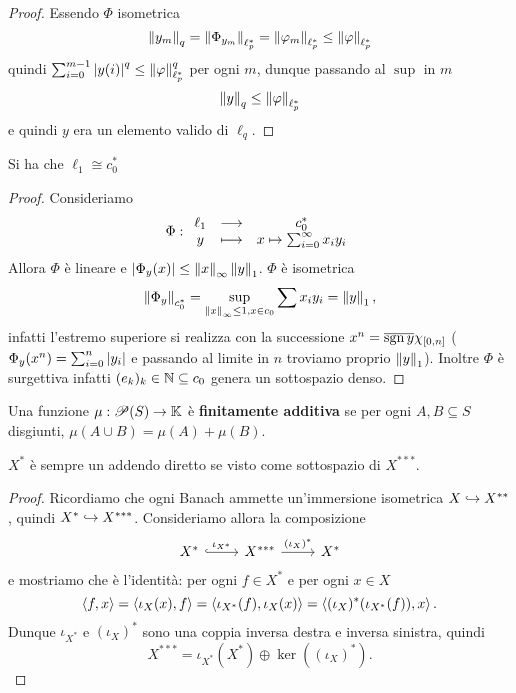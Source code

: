 \begin{proof}
Essendo $\Phi$ isometrica
\[\left\Vert{y_m}\right\Vert_q=\left\Vert{\Phi_{y_m}}\right\Vert_{\ell_p^\ast}=\left\Vert{\varphi_m}\right\Vert_{\ell_p^\ast}\leq \left\Vert{\varphi}\right\Vert_{\ell_p^\ast}\]
quindi $\sum_{i=0}^{m-1}\left|{y(i)}\right|^q\leq \left\Vert{\varphi}\right\Vert_{\ell_p^\ast}^q$ per ogni $m$, dunque passando al $\sup$ in $m$ 
\[\left\Vert{y}\right\Vert_q\leq \left\Vert{\varphi}\right\Vert_{\ell_p^\ast}\]
e quindi $y$ era un elemento valido di $\ell_q$.
\setlength{\leftmargini}{0.5cm}
\end{proof}


\begin{proposition}\label{PrDualec0El1}
Si ha che $\ell_1\cong c_0^\ast$
\end{proposition}
\begin{proof}
Consideriamo
\[\Phi:\begin{array}{ccc} {\ell_1} & \longrightarrow & {c_0^\ast}\\ {y} & \longmapsto & {x\mapsto \sum_{i=0}^\infty x_i y_i} \end{array}\]
Allora $\Phi$ \`e lineare e $\left|{\Phi_y(x)}\right|\leq \left\Vert{x}\right\Vert_\infty\left\Vert{y}\right\Vert_1$. $\Phi$ \`e isometrica
\[\left\Vert{\Phi_y}\right\Vert_{c_0^\ast}=\sup_{\left\Vert{x}\right\Vert_\infty\leq 1, x\in c_0}\sum x_i y_i=\left\Vert{y}\right\Vert_1,\]
infatti l'estremo superiore si realizza con la successione $x^n=\overline{\operatorname{sgn} y}\chi_{[0,n]}$ ($\Phi_y(x^n)=\sum_{i=0}^n\left|{y_i}\right|$ e passando al limite in $n$ troviamo proprio $\left\Vert{y}\right\Vert_1$). Inoltre $\Phi$ \`e surgettiva infatti $(e_k)_k\in\mathbb{N}\subseteq c_0$ genera un sottospazio denso.
\end{proof}


\begin{definition}
Una funzione $\mu:\mathscr{P}(S)\to\mathbb{K}$ \`e \textbf{finitamente additiva} se per ogni $A,B\subseteq S$ disgiunti, $\mu(A\cup B)=\mu(A)+\mu(B)$.
\end{definition}

\begin{lemma}\label{LmDualeComplementatoNelTriduale}
$X^\ast$ \`e sempre un addendo diretto se visto come sottospazio di $X^{\ast\ast\ast}$.
\end{lemma}
\begin{proof}
Ricordiamo che ogni Banach ammette un'immersione isometrica $X\hookrightarrow X^{\ast\ast}$, quindi $X^\ast\hookrightarrow X^{\ast\ast\ast}$. Consideriamo allora la composizione
\[\begin{tikzcd}
	{X^\ast} & {X^{\ast\ast\ast}} & {X^\ast}
	\arrow["{\iota_{X^\ast}}", hook, from=1-1, to=1-2]
	\arrow["{(\iota_X)^\ast}", from=1-2, to=1-3]
\end{tikzcd}\]
e mostriamo che \`e l'identit\`a: per ogni $f\in X^\ast$ e per ogni $x\in X$
\[\left\langle {f,x}\right\rangle=\left\langle {\iota_{X}(x),f}\right\rangle=\left\langle {\iota_{X^\ast}(f),\iota_{X}(x)}\right\rangle=\left\langle {(\iota_X)^\ast(\iota_{X^\ast}(f)),x}\right\rangle.\]
Dunque $\iota_{X^\ast}$ e $(\iota_X)^\ast$ sono una coppia inversa destra e inversa sinistra, quindi
\[X^{\ast\ast\ast}=\iota_{X^\ast}(X^\ast)\oplus \ker((\iota_X)^\ast).\]
\end{proof}

